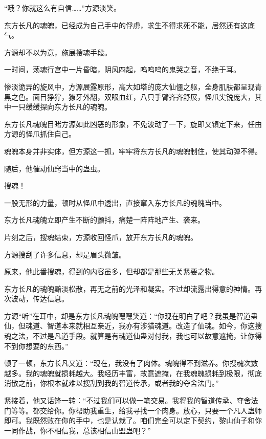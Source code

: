 
\begin{this_body}



“哦？你就这么有自信……”方源淡笑。

东方长凡的魂魄，已经成为自己手中的俘虏，求生不得求死不能，居然还有这底气。

方源却不以为意，施展搜魂手段。

一时间，荡魂行宫中一片昏暗，阴风四起，呜呜呜的鬼哭之音，不绝于耳。

惨淡诡异的旋风中，方源展露原形，高大如塔的庞大仙僵之躯，全身肌肤都呈现青黑之色。面目狰狞，獠牙外翻，双眼血红，八只手臂齐齐舒展，怪爪尖锐庞大，其中一只缓缓探向东方长凡的魂魄。

东方长凡魂魄目睹方源如此凶恶的形象，不免波动了一下，旋即又镇定下来，任由方源的怪爪抓住自己。

魂魄本身并非实体，但方源这一抓，牢牢将东方长凡的魂魄制住，使其动弹不得。

随后，他催动仙窍当中的蛊虫。

搜魂！

一股无形的力量，顿时从怪爪中透出，直接窜入东方长凡的魂魄当中。

东方长凡魂魄立即产生不断的颤抖，痛楚一阵阵地产生、袭来。

片刻之后，搜魂结束，方源收回怪爪，放开东方长凡的魂魄。

方源搜刮了许多信息，却是眉头微皱。

原来，他此番搜魂，得到的内容虽多，但却都是那些无关紧要之物。

东方长凡的魂魄黯淡松散，再无之前的光泽和凝实。不过却流露出得意的神情。再次波动，传达信息。

方源“听”在耳中，却是东方长凡魂魄嘿嘿笑道：“你现在明白了吧？我虽是智道蛊仙，但魂道、智道本来就相互亲近，我亦有涉猎魂道。改造了仙魂。如今，你这搜魂之法，不过是凡道手段。就算是有魂道仙蛊对付我，我也可以故意遮掩，让你得不到你想要的东西。”

顿了一顿，东方长凡又道：“现在，我没有了肉体。魂魄得不到滋养。你搜魂次数越多。我的魂魄就损耗越大。我经历丰富，故意遮掩，在我魂魄损耗到极限，彻底消散之前，你根本就难以搜刮到我的智道传承，或者我的夺舍法门。”

紧接着，他又话锋一转：“不过我们可以做一笔交易。我将我的智道传承、夺舍法门等等。都交给你。你帮助我重生，给我寻找一个肉身。放心，只要一个凡人蛊师即可。我既然败在你的手中，也是认栽了。咱们完全可以定下契约，黎山仙子和你一同作战，你不相信我，总该相信山盟蛊吧？”


\end{this_body}
